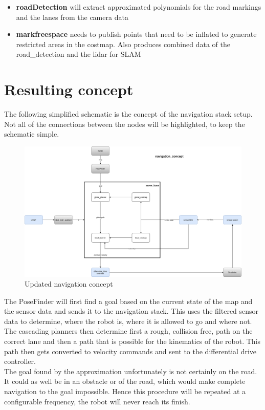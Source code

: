 \begin{itemize}
	\item \textbf{roadDetection} will extract approximated polynomials for the road markings and the lanes from the camera data
	\item \textbf{markfreespace} needs to publish points that need to be inflated to generate restricted areas in the costmap. Also produces combined data of the road\_detection and the lidar for SLAM
\end{itemize}


\section{Resulting concept}
The following simplified schematic is the concept of the navigation stack setup. Not all of the connections between the nodes will be highlighted, to keep the schematic simple.\\

\begin{figure}[H]
	\begin{center}
		\includegraphics[width=140mm]{Pictures/Updated navigation concept}
		\caption[updated navigation concept]{Updated navigation concept}
	\end{center}
\end{figure}



The PoseFinder will first find a goal based on the current state of the map and the sensor data and sends it to the navigation stack. This uses the filtered sensor data to determine, where the robot is, where it is allowed to go and where not. The cascading planners then determine first a rough, collision free, path on the correct lane and then a path that is possible for the kinematics of the robot. This path then gets converted to velocity commands and sent to the differential drive controller.\\

The goal found by the approximation unfortunately is not certainly on the road. It could as well be in an obstacle or of the road, which would make complete navigation to the goal impossible. Hence this procedure will be repeated at a configurable frequency, the robot will never reach its finish. 



